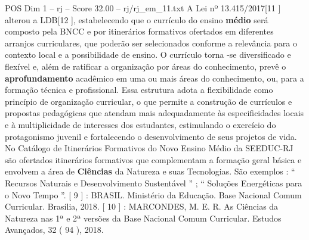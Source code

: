 \begin{textsample}{POS Dim 1 – rj – Score 32.00 – rj/rj\_em\_11.txt}
A Lei nº 13.415/2017[11 ] alterou a LDB[12 ], estabelecendo que o currículo do ensino \textbf{médio} será composto pela BNCC e por itinerários formativos ofertados em diferentes arranjos curriculares, que poderão ser selecionados conforme a relevância para o contexto local e a possibilidade de ensino.
O currículo torna -se diversificado e flexível e, além de ratificar a organização por áreas do conhecimento, prevê o \textbf{aprofundamento} acadêmico em uma ou mais áreas do conhecimento, ou, para a formação técnica e profissional.
Essa estrutura adota a flexibilidade como princípio de organização curricular, o que permite a construção de currículos e propostas pedagógicas que atendam mais adequadamente às especificidades locais e à multiplicidade de interesses dos estudantes, estimulando o exercício do protagonismo juvenil e fortalecendo o desenvolvimento de seus projetos de vida.
No Catálogo de Itinerários Formativos do Novo Ensino Médio da SEEDUC-RJ são ofertados itinerários formativos que complementam a formação geral básica e envolvem a área de \textbf{Ciências} da Natureza e suas Tecnologias.
São exemplos : “ Recursos Naturais e Desenvolvimento Sustentável ” ; “ Soluções Energéticas para o Novo Tempo ”. [ 9 ] : BRASIL.
Ministério da Educação.
Base Nacional Comum Curricular.
Brasília, 2018. [ 10 ] : MARCONDES, M.
E.
R.
As Ciências da Natureza nas 1ª e 2ª versões da Base Nacional Comum Curricular.
Estudos Avançados, 32 ( 94 ), 2018.

\end{textsample}

